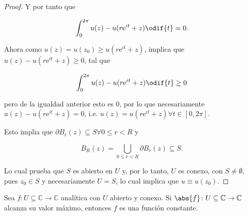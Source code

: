 \documentclass[../main.tex]{subfiles}
\begin{document}
\begin{proof}
    Y por tanto que

    \begin{equation*}
        \int_{0}^{2\pi}u(z) - u(r \mathrm{e}^{it} + z)\odif{t} = 0.
    \end{equation*}

    Ahora como \(u(z) = u(z_{0}) \geq u(r \mathrm{e}^{it} + z)\), implica que
    \(u(z) - u(r
    \mathrm{e}^{it} + z) \geq 0\), tal que

    \begin{equation*}
        \int_{0}^{2\pi}u(z) - u(r \mathrm{e}^{it} + z)\odif{t} \geq 0
    \end{equation*}

    pero de la igualdad anterior esto es \(0\), por lo que necesariamente \(u(z) - u(r
    \mathrm{e}^{it} + z) = 0\), i.e. \(u(z) = u(r \mathrm{e}^{it} + z) \forall t\in [0,
    2\pi]\).

    Esto implia que \(\partial B_{r}(z) \subseteq S \forall 0 \leq r < R\) y

    \begin{equation*}
        B_{R}(z) = \bigcup_{0 \leq r < R}\partial B_{r}(z) \subseteq S.
    \end{equation*}

    Lo cual prueba que \(S\) es abierto en \(U\) y, por lo tanto, \(U\) es
    conexo, con \(S \neq
    \emptyset\), pues \(z_{0}\in  S\) y necesariamente \(U = S\), lo cual
    implica que \(u
    \equiv u(z_{0})\).
\end{proof}

\begin{theorem}
    Sea \(f \colon U \subseteq \mathbb{C} \to \mathbb{C}\) analítica con \(U\) abierto y
    conexo. Si \(\abs{f} \colon U \subseteq \mathbb{C} \to \mathbb{C}\) alcanza su valor
    máximo, entonces \(f\) es una función constante.
\end{theorem}
\end{document}
